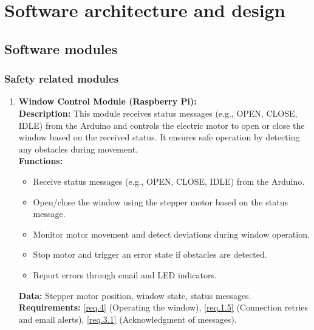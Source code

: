 \section{Software architecture and design}
\label{chapter2}

\subsection{Software modules}

\subsubsection{Safety related modules}
\begin{enumerate}
    \item \textbf{Window Control Module (Raspberry Pi):} \\ 
        \textbf{Description:} This module receives status messages (e.g., OPEN, CLOSE, IDLE) from the Arduino and controls the electric motor to open or close the window based on the received status. It ensures safe operation by detecting any obstacles during movement. \\ 
        \textbf{Functions:}
        \begin{itemize}
            \item Receive status messages (e.g., OPEN, CLOSE, IDLE) from the Arduino.
            \item Open/close the window using the stepper motor based on the status message.
            \item Monitor motor movement and detect deviations during window operation.
            \item Stop motor and trigger an error state if obstacles are detected.
            \item Report errors through email and LED indicators.
        \end{itemize}
        \textbf{Data:} Stepper motor position, window state, status messages. \\ 
        \textbf{Requirements:} \ref{req.4} (Operating the window), \ref{req.1.5} (Connection retries and email alerts), \ref{req.3.1} (Acknowledgment of messages).
        

\end{enumerate}
